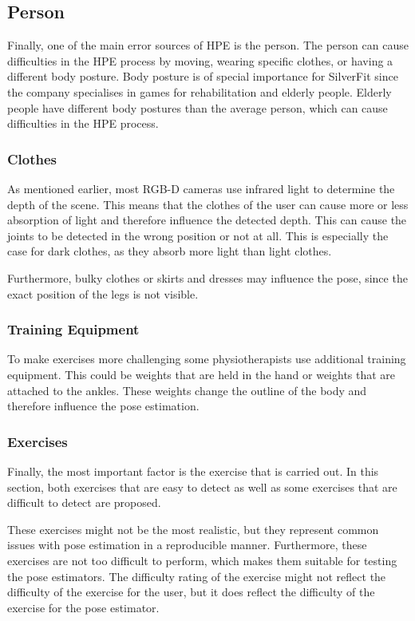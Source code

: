 \subsection{Person}

Finally, one of the main error sources of HPE is the person. The person can cause difficulties in the HPE process by moving, wearing specific clothes, or having a different body posture. Body posture is of special importance for SilverFit since the company specialises in games for rehabilitation and elderly people. Elderly people have different body postures than the average person, which can cause difficulties in the HPE process.

\subsubsection{Clothes}

As mentioned earlier, most RGB-D cameras use infrared light to determine the depth of the scene. This means that the clothes of the user can cause more or less absorption of light and therefore influence the detected depth. This can cause the joints to be detected in the wrong position or not at all. This is especially the case for dark clothes, as they absorb more light than light clothes.

Furthermore, bulky clothes or skirts and dresses may influence the pose, since the exact position of the legs is not visible.

\subsubsection{Training Equipment}

To make exercises more challenging some physiotherapists use additional training equipment. This could be weights that are held in the hand or weights that are attached to the ankles. These weights change the outline of the body and therefore influence the pose estimation. 

\subsubsection{Exercises}
\label{sec:exercises}

Finally, the most important factor is the exercise that is carried out. In this section, both exercises that are easy to detect as well as some exercises that are difficult to detect are proposed.

These exercises might not be the most realistic, but they represent common issues with pose estimation in a reproducible manner. Furthermore, these exercises are not too difficult to perform, which makes them suitable for testing the pose estimators. The difficulty rating of the exercise might not reflect the difficulty of the exercise for the user, but it does reflect the difficulty of the exercise for the pose estimator.

